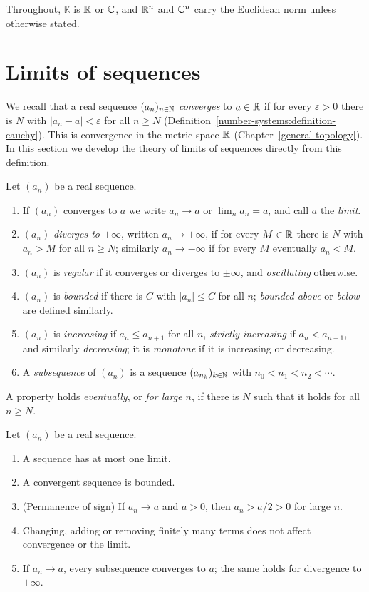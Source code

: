 Throughout, $\mathbb{K}$ is $\mathbb{R}$ or $\mathbb{C}$, and $\mathbb{R}^n$ and $\mathbb{C}^n$ carry the Euclidean norm unless otherwise stated.

\section{Limits of sequences}\label{real-analysis:section-sequences}

We recall that a real sequence $(a_n)_{n \in \mathbb{N}}$ \emph{converges} to $a \in \mathbb{R}$ if for every $\varepsilon > 0$ there is $N$ with $|a_n - a| < \varepsilon$ for all $n \geq N$
(Definition~\ref{number-systems:definition-cauchy}). This is convergence in the metric space $\mathbb{R}$ (Chapter~\ref{general-topology}). In this section we develop the theory of limits of sequences directly
from this definition.

\begin{definition}\label{real-analysis:definition-sequence-terms}
Let $(a_n)$ be a real sequence.
\begin{enumerate}
\item If $(a_n)$ converges to $a$ we write $a_n \to a$ or $\lim_na_n = a$, and call $a$ the \emph{limit}.
\item $(a_n)$ \emph{diverges to $+\infty$}, written $a_n \to +\infty$, if for every $M \in \mathbb{R}$ there is $N$ with $a_n > M$ for all $n \geq N$; similarly $a_n \to -\infty$ if for every $M$ eventually $a_n < M$.
\item $(a_n)$ is \emph{regular} if it converges or diverges to $\pm\infty$, and \emph{oscillating} otherwise.
\item $(a_n)$ is \emph{bounded} if there is $C$ with $|a_n| \leq C$ for all $n$; \emph{bounded above} or \emph{below} are defined similarly.
\item $(a_n)$ is \emph{increasing} if $a_n \leq a_{n+1}$ for all $n$, \emph{strictly increasing} if $a_n < a_{n+1}$, and similarly \emph{decreasing}; it is \emph{monotone} if it is increasing or decreasing.
\item A \emph{subsequence} of $(a_n)$ is a sequence $(a_{n_k})_{k \in \mathbb{N}}$ with $n_0 < n_1 < n_2 < \cdots$.
\end{enumerate}
A property holds \emph{eventually}, or \emph{for large $n$}, if there is $N$ such that it holds for all $n \geq N$.
\end{definition}

\begin{proposition}\label{real-analysis:proposition-sequence-basic}
Let $(a_n)$ be a real sequence.
\begin{enumerate}
\item A sequence has at most one limit.
\item A convergent sequence is bounded.
\item (Permanence of sign) If $a_n \to a$ and $a > 0$, then $a_n > a/2 > 0$ for large $n$.
\item Changing, adding or removing finitely many terms does not affect convergence or the limit.
\item If $a_n \to a$, every subsequence converges to $a$; the same holds for divergence to $\pm\infty$.
\end{enumerate}
\end{proposition}

